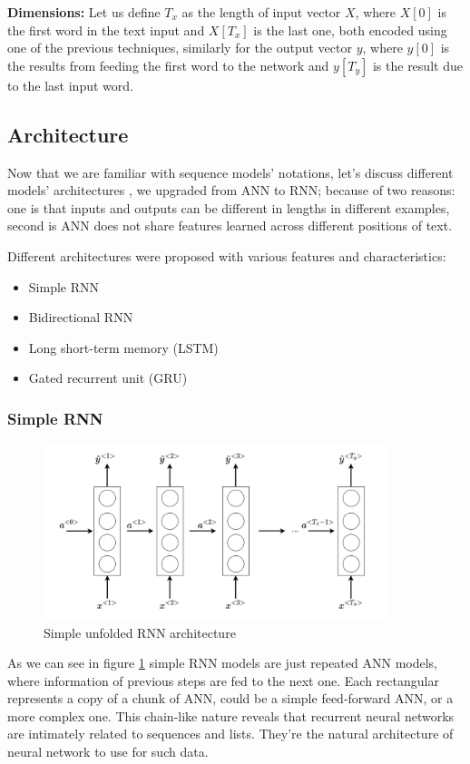\textbf{Dimensions:} Let us define $T_x$ as the length of input vector $X$, where $X[0]$ is the first word in the text input and $X[T_x]$ is the last one, both encoded using one of the previous techniques, similarly for the output vector $y$, where $y[0]$ is the results from feeding the first word to the network and $y[T_y]$ is the result due to the last input word.





\subsection{Architecture} 
Now that we are familiar with sequence models' notations, let's discuss different models' architectures \cite{rnn_models}, we upgraded from ANN to RNN; because of two reasons: one is that inputs and outputs can be different in lengths in different examples, second is ANN does not share features learned across different positions of text.

Different architectures were proposed with various features and characteristics:
\begin{itemize}
    \item Simple RNN
    \item Bidirectional RNN
    \item Long short-term memory (LSTM)
    \item Gated recurrent unit (GRU)
\end{itemize}

\subsubsection{Simple RNN}

\begin{figure}[h]
    \centering
    \includegraphics[width=0.9\textwidth]{images/rnn_1.png}
    \caption{Simple unfolded RNN architecture}
    \label{fig:simple_rnn}
\end{figure}
As we can see in figure \ref{fig:simple_rnn} simple RNN models are just repeated ANN models, where information of previous steps are fed to the next one. Each rectangular represents a copy of a chunk of ANN, could be a simple feed-forward ANN, or a more complex one. This chain-like nature reveals that recurrent neural networks are intimately related to sequences and lists. They’re the natural architecture of neural network to use for such data.


